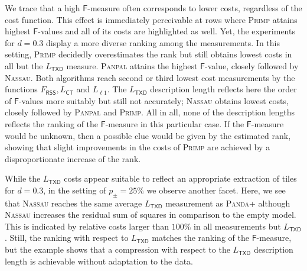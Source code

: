 We trace that a high $\mathsf{F}$-measure often corresponds to lower costs, regardless of the cost function. This effect is immediately perceivable at rows where \textsc{Primp} attains highest $\mathsf{F}$-values and all of its costs are highlighted as well. Yet, the experiments for $d=0.3$ display a  more diverse ranking among the measurements. In this setting, \textsc{Primp} decidedly overestimates the rank but still obtains lowest costs in all but the $L_\mathsf{TXD}$ measure. \textsc{Panpal} attains the highest $\mathsf{F}$-value, closely followed by \textsc{Nassau}. Both algorithms reach second or third lowest cost measurements by the functions $F_{\mathsf{RSS}},L_{\mathsf{CT}}$ and $L_{\ell 1}$. The $L_\mathsf{TXD}$ description length reflects here the order of $\mathsf{F}$-values more suitably but still not accurately; \textsc{Nassau} obtains lowest costs, closely followed by \textsc{Panpal} and \textsc{Primp}. All in all, none of the description lengths reflects the ranking of the $\mathsf{F}$-measure in this particular case. If the $\mathsf{F}$-measure would be unknown, then a possible clue would be given by the estimated rank, showing that slight improvements in the costs of \textsc{Primp} are achieved by a disproportionate increase of the rank. 

While the $L_\mathsf{TXD}$ costs appear suitable to reflect an appropriate extraction of tiles for $d=0.3$, in the setting of $p_\pm=25\%$ we observe another facet. Here, we see that  \textsc{Nassau} reaches the same average $L_\mathsf{TXD}$ measurement as \textsc{Panda+} although \textsc{Nassau} increases the residual sum of squares in comparison to the empty model. This is indicated by relative costs larger than $100\%$ in all measurements but $L_\mathsf{TXD}$. Still, the ranking with respect to $L_\mathsf{TXD}$ matches the ranking of the $\mathsf{F}$-measure, but the example shows that a compression with respect to the $L_\mathsf{TXD}$ description length is achievable without adaptation to the data.

